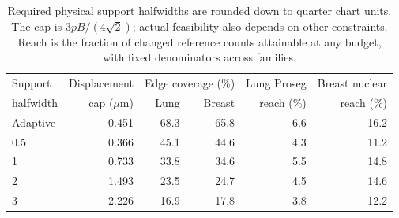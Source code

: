\begin{table}[!htbp]\centering
\begin{tabular}{lrrrrr}\toprule
Support&Displacement&\multicolumn{2}{c}{Edge coverage (\%)}&Lung Proseg&Breast nuclear\\
halfwidth&cap ($\mu$m)&Lung&Breast&reach (\%)&reach (\%)\\\midrule
Adaptive&0.451&68.3&65.8&6.6&16.2\\
0.5&0.366&45.1&44.6&4.3&11.2\\
1&0.733&33.8&34.6&5.5&14.8\\
2&1.493&23.5&24.7&4.5&14.6\\
3&2.226&16.9&17.8&3.8&12.2\\
\bottomrule\end{tabular}
\caption{Required physical support halfwidths are rounded down to quarter chart units. The cap is $3pB/(4\sqrt2)$; actual feasibility also depends on other constraints. Reach is the fraction of changed reference counts attainable at any budget, with fixed denominators across families.}\label{tab:reach}
\end{table}
